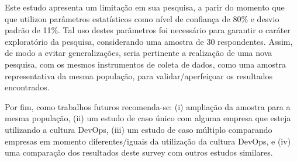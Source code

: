 \documentclass[twoside,english,brazilian]{UNISINOSartigo}
\begin{document}
Este estudo apresenta um limitação em sua pesquisa, a parir do momento que que utilizou parâmetros estatísticos como nível de confiança de 80\% e desvio padrão de 11\%. Tal uso destes parâmetros foi necessário para garantir o caráter exploratório da pesquisa, considerando uma amostra de 30 respondentes. Assim, de modo a evitar generalizações, seria pertinente a realização de uma nova pesquisa, com os mesmos instrumentos de coleta de dados, como uma amostra representativa da mesma população, para validar/aperfeiçoar os resultados encontrados.

Por fim, como trabalhos futuros recomenda-se: (i) ampliação da amostra para a mesma população, (ii) um estudo de caso único com alguma empresa que esteja utilizando a cultura DevOps, (iii) um estudo de caso múltiplo comparando empresas em momento diferentes/iguais da utilização da cultura DevOps, e (iv) uma comparação dos resultados deste survey com outros estudos similares.





%



\end{document}
